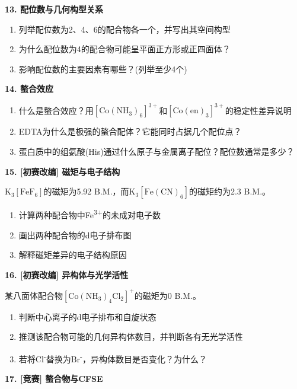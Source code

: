 \textbf{13. 配位数与几何构型关系}

\begin{enumerate}
\def\labelenumi{(\alph{enumi})}
\tightlist
\item
  列举配位数为2、4、6的配合物各一个，并写出其空间构型
\item
  为什么配位数为4的配合物可能呈平面正方形或正四面体？
\item
  影响配位数的主要因素有哪些？(列举至少4个)
\end{enumerate}

\textbf{14. 螯合效应}

\begin{enumerate}
\def\labelenumi{(\alph{enumi})}
\tightlist
\item
  什么是螯合效应？用\(\mathrm{[Co(NH_3)_6]^{3+}}\)和\(\mathrm{[Co(en)_3]^{3+}}\)的稳定性差异说明
\item
  EDTA为什么是极强的螯合配体？它能同时占据几个配位点？
\item
  蛋白质中的组氨酸(His)通过什么原子与金属离子配位？配位数通常是多少？
\end{enumerate}

\textbf{15. {[}初赛改编{]} 磁矩与电子结构}

\(\mathrm{K_3[FeF_6]}\)的磁矩为5.92 B.M.，而\(\mathrm{K_3[Fe(CN)_6]}\)的磁矩约为2.3 B.M.。

\begin{enumerate}
\def\labelenumi{(\alph{enumi})}
\tightlist
\item
  计算两种配合物中Fe\textsuperscript{3+}的未成对电子数
\item
  画出两种配合物的d电子排布图
\item
  解释磁矩差异的电子结构原因
\end{enumerate}

\textbf{16. {[}初赛改编{]} 异构体与光学活性}

某八面体配合物\(\mathrm{[Co(NH_3)_4Cl_2]^+}\)的磁矩为0 B.M.。

\begin{enumerate}
\def\labelenumi{(\alph{enumi})}
\tightlist
\item
  判断中心离子的d电子排布和自旋状态
\item
  推测该配合物可能的几何异构体数目，并判断各有无光学活性
\item
  若将Cl\textsuperscript{-}替换为Br\textsuperscript{-}，异构体数目是否变化？为什么？
\end{enumerate}

\textbf{17. {[}竞赛{]} 螯合物与CFSE}

